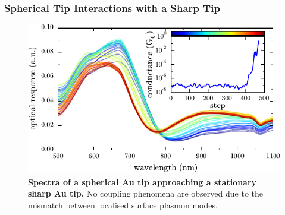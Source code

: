 \documentclass[a4paper]{article}
\begin{document}




\subsubsection{Spherical Tip Interactions with a Sharp Tip}

\begin{figure}[bt]
\centering
\includegraphics{figures/sharp-AuNP_tip_dimer}
\caption[Spectra of a spherical Au tip approaching a stationary sharp Au tip]{\textbf{Spectra of a spherical Au tip approaching a stationary sharp Au tip.} No coupling phenomena are observed due to the mismatch between localised surface plasmon modes.}
\label{fig:spherical_sharp_tip_scan}
\end{figure}
\end{document}
